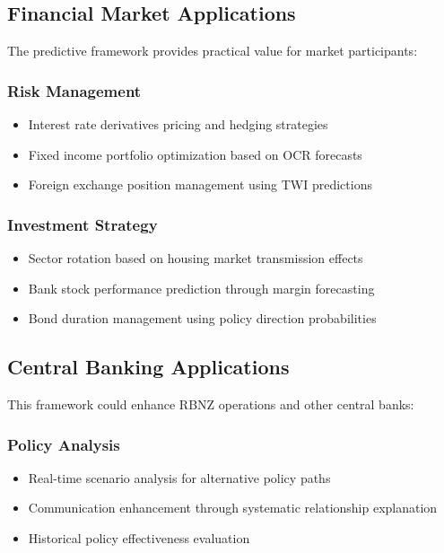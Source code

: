 \documentclass[11pt,a4paper]{article}
\begin{document}
	\subsection{Financial Market Applications}
	The predictive framework provides practical value for market participants:
	
	\subsubsection{Risk Management}
	\begin{itemize}
		\item Interest rate derivatives pricing and hedging strategies
		\item Fixed income portfolio optimization based on OCR forecasts
		\item Foreign exchange position management using TWI predictions
	\end{itemize}
	
	\subsubsection{Investment Strategy}
	\begin{itemize}
		\item Sector rotation based on housing market transmission effects
		\item Bank stock performance prediction through margin forecasting
		\item Bond duration management using policy direction probabilities
	\end{itemize}
	
	\subsection{Central Banking Applications}
	This framework could enhance RBNZ operations and other central banks:
	
	\subsubsection{Policy Analysis}
	\begin{itemize}
		\item Real-time scenario analysis for alternative policy paths
		\item Communication enhancement through systematic relationship explanation
		\item Historical policy effectiveness evaluation
	\end{itemize}
	
\end{document}
